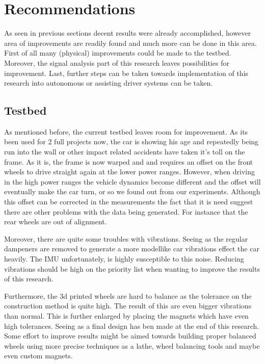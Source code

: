 \section{Recommendations}
As seen in previous sections decent results were already accomplished, however area of improvements are readily found and much more can be done in this area. First of all many (physical) improvements could be made to the testbed. Moreover, the signal analysis part of this research leaves possibilities for improvement. Last, further steps can be taken towards implementation of this research into autonomous or assisting driver systems can be taken.

\subsection{Testbed}
As mentioned before, the current testbed leaves room for improvement. As it\textquotesingle s been used for 2 full projects now, the car is showing his age and repeatedly being run into the wall or other impact related accidents have taken it's toll on the frame. As it is, the frame is now warped and and requires an offset on the front wheels to drive straight again at the lower power ranges. However, when driving in the high power ranges the vehicle dynamics become different and the offset will eventually make the car turn, or so we found out from our experiments. Although this offset can be corrected in the measurements the fact that it is need suggest there are other problems with the data being generated. For instance that the rear wheels are out of alignment. 

Moreover, there are quite some troubles with vibrations. Seeing as the regular dampeners are removed to generate a more modellike car vibrations effect the car heavily. The IMU unfortunately, is highly susceptible to this noise. Reducing vibrations should be high on the priority list when wanting to improve the results of this research.

Furthermore, the 3d printed wheels are hard to balance as the tolerance on the construction method is quite high. The result of this are even bigger vibrations than normal. This is further enlarged by placing the magnets which have even high tolerances. Seeing as a final design has ben made at the end of this research. Some effort to improve results might be aimed towards building proper balanced wheels using more precise techniques as a lathe, wheel balancing tools and maybe even custom magnets.
